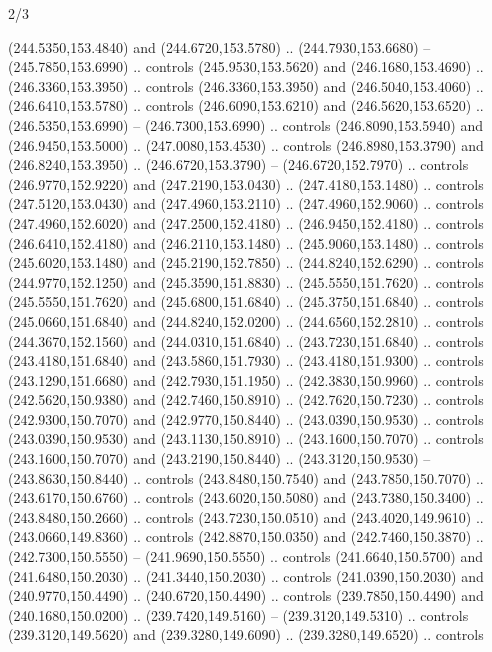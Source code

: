 \begin{flagdescription}{2/3}
\begin{scope}[xshift=0.5\flaglength,yshift=0.5\flagwidth,scale=\flagwidth/259.2]
\begin{scope}[y=0.8pt, x=0.8pt, yscale=-1,shift={(-243,-162)}]
      (244.5350,153.4840) and (244.6720,153.5780) .. (244.7930,153.6680) --
      (245.7850,153.6990) .. controls (245.9530,153.5620) and (246.1680,153.4690) ..
      (246.3360,153.3950) .. controls (246.3360,153.3950) and (246.5040,153.4060) ..
      (246.6410,153.5780) .. controls (246.6090,153.6210) and (246.5620,153.6520) ..
      (246.5350,153.6990) -- (246.7300,153.6990) .. controls (246.8090,153.5940) and
      (246.9450,153.5000) .. (247.0080,153.4530) .. controls (246.8980,153.3790) and
      (246.8240,153.3950) .. (246.6720,153.3790) -- (246.6720,152.7970) .. controls
      (246.9770,152.9220) and (247.2190,153.0430) .. (247.4180,153.1480) .. controls
      (247.5120,153.0430) and (247.4960,153.2110) .. (247.4960,152.9060) .. controls
      (247.4960,152.6020) and (247.2500,152.4180) .. (246.9450,152.4180) .. controls
      (246.6410,152.4180) and (246.2110,153.1480) .. (245.9060,153.1480) .. controls
      (245.6020,153.1480) and (245.2190,152.7850) .. (244.8240,152.6290) .. controls
      (244.9770,152.1250) and (245.3590,151.8830) .. (245.5550,151.7620) .. controls
      (245.5550,151.7620) and (245.6800,151.6840) .. (245.3750,151.6840) .. controls
      (245.0660,151.6840) and (244.8240,152.0200) .. (244.6560,152.2810) .. controls
      (244.3670,152.1560) and (244.0310,151.6840) .. (243.7230,151.6840) .. controls
      (243.4180,151.6840) and (243.5860,151.7930) .. (243.4180,151.9300) .. controls
      (243.1290,151.6680) and (242.7930,151.1950) .. (242.3830,150.9960) .. controls
      (242.5620,150.9380) and (242.7460,150.8910) .. (242.7620,150.7230) .. controls
      (242.9300,150.7070) and (242.9770,150.8440) .. (243.0390,150.9530) .. controls
      (243.0390,150.9530) and (243.1130,150.8910) .. (243.1600,150.7070) .. controls
      (243.1600,150.7070) and (243.2190,150.8440) .. (243.3120,150.9530) --
      (243.8630,150.8440) .. controls (243.8480,150.7540) and (243.7850,150.7070) ..
      (243.6170,150.6760) .. controls (243.6020,150.5080) and (243.7380,150.3400) ..
      (243.8480,150.2660) .. controls (243.7230,150.0510) and (243.4020,149.9610) ..
      (243.0660,149.8360) .. controls (242.8870,150.0350) and (242.7460,150.3870) ..
      (242.7300,150.5550) -- (241.9690,150.5550) .. controls (241.6640,150.5700) and
      (241.6480,150.2030) .. (241.3440,150.2030) .. controls (241.0390,150.2030) and
      (240.9770,150.4490) .. (240.6720,150.4490) .. controls (239.7850,150.4490) and
      (240.1680,150.0200) .. (239.7420,149.5160) -- (239.3120,149.5310) .. controls
      (239.3120,149.5620) and (239.3280,149.6090) .. (239.3280,149.6520) .. controls

\end{scope}
\end{scope}
\end{flagdescription}
